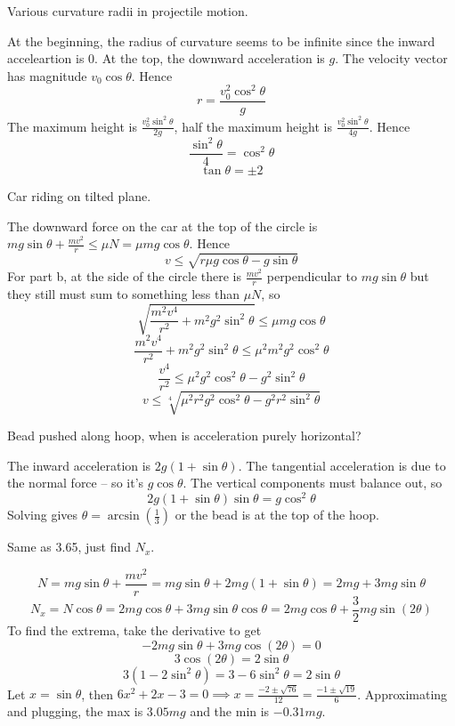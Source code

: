 \documentclass[11pt]{scrartcl}
\begin{document}
\begin{example}
  [3.62]
  Various curvature radii in projectile motion.
\end{example}
\begin{soln}
  At the beginning, the radius of curvature seems to be infinite since the
  inward acceleartion is $0$. At the top, the downward acceleration is $g$.
  The velocity vector has magnitude $v_0\cos\theta$. Hence
  $$r=\frac{v_0^2\cos^2\theta}{g}$$
  The maximum height is $\frac{v_0^2\sin^2\theta}{2g}$, half the maximum height
  is $\frac{v_0^2\sin^2\theta}{4g}$. Hence
  $$\frac{\sin^2\theta}{4}=\cos^2\theta$$
  $$\tan\theta=\pm 2$$
\end{soln}
\begin{example}
  [3.63]
  Car riding on tilted plane.
\end{example}
\begin{soln}
  The downward force on the car at the top of the circle is $mg\sin\theta+\frac{mv^2}{r}\le \mu N=\mu mg\cos\theta$.
  Hence
  $$v\le \sqrt{r\mu g\cos\theta-g\sin\theta}$$
  For part b, at the side of the circle there is $\frac{mv^2}{r}$ perpendicular
  to $mg\sin\theta$ but they still must sum to something less than $\mu N$, so
  $$\sqrt{\frac{m^2v^4}{r^2}+m^2g^2\sin^2\theta}\le \mu mg\cos\theta$$
  $$\frac{m^2v^4}{r^2}+m^2g^2\sin^2\theta \le \mu^2 m^2 g^2 \cos^2 \theta$$
  $$\frac{v^4}{r^2}\le \mu^2 g^2\cos^2\theta-g^2\sin^2\theta$$
  $$v\le \sqrt[4]{\mu^2 r^2 g^2 \cos^2\theta-g^2r^2\sin^2\theta}$$
\end{soln}
\begin{example}
  [3.64]
\end{example}
\begin{soln}
\end{soln}
\begin{example}
  [3.65]
  Bead pushed along hoop, when is acceleration purely horizontal?
\end{example}
\begin{soln}
  The inward acceleration is $2g(1+\sin\theta)$. The tangential acceleration
  is due to the normal force -- so it's $g\cos\theta$. The vertical components
  must balance out, so
  $$2g(1+\sin\theta)\sin\theta=g\cos^2\theta$$
  Solving gives $\theta=\arcsin\left(\frac{1}{3}\right)$ or the bead is at the
  top of the hoop.
\end{soln}
\begin{example}
  [3.66]
  Same as 3.65, just find $N_x$.
\end{example}
\begin{soln}
  $$N=mg\sin\theta+\frac{mv^2}{r}=mg\sin\theta+2mg(1+\sin\theta)=2mg+3mg\sin\theta$$
  $$N_x=N\cos\theta=2mg\cos\theta+3mg\sin\theta\cos\theta=2mg\cos\theta+\frac{3}{2}mg\sin(2\theta)$$
  To find the extrema, take the derivative to get
  $$-2mg\sin\theta+3mg\cos(2\theta)=0$$
  $$3\cos(2\theta)=2\sin\theta$$
  $$3(1-2\sin^2\theta)=3-6\sin^2\theta=2\sin\theta$$
  Let $x=\sin\theta$, then $6x^2+2x-3=0\implies x=\frac{-2\pm \sqrt{76}}{12}=\frac{-1\pm \sqrt{19}}{6}$.
  Approximating and plugging, the max is $3.05mg$ and the min is $-0.31mg$.
\end{soln}
\end{document}
